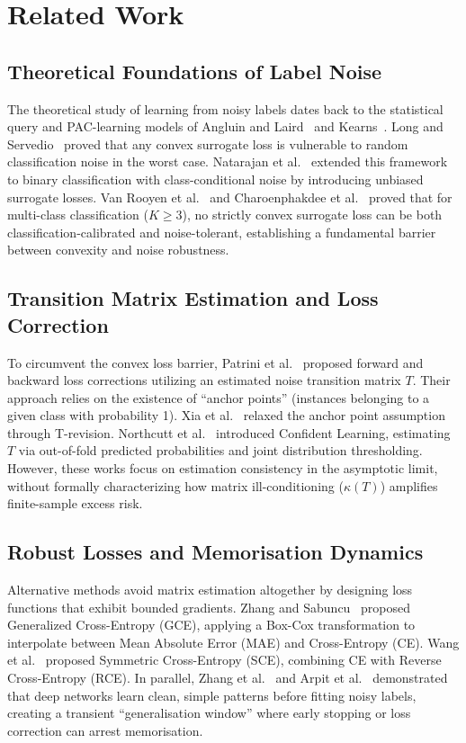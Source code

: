 \documentclass[journal]{IEEEtran}
\theoremstyle{definition}
\begin{document}
\section{Related Work}

\subsection{Theoretical Foundations of Label Noise}
The theoretical study of learning from noisy labels dates back to the statistical query and PAC-learning models of Angluin and Laird~\cite{angluin1988learning} and Kearns~\cite{kearns1998efficient}. Long and Servedio~\cite{long2010random} proved that any convex surrogate loss is vulnerable to random classification noise in the worst case. Natarajan et al.~\cite{natarajan2013learning} extended this framework to binary classification with class-conditional noise by introducing unbiased surrogate losses. Van Rooyen et al.~\cite{van2015learning} and Charoenphakdee et al.~\cite{charoenphakdee2019symmetric} proved that for multi-class classification ($K \ge 3$), no strictly convex surrogate loss can be both classification-calibrated and noise-tolerant, establishing a fundamental barrier between convexity and noise robustness.

\subsection{Transition Matrix Estimation and Loss Correction}
To circumvent the convex loss barrier, Patrini et al.~\cite{patrini2017making} proposed forward and backward loss corrections utilizing an estimated noise transition matrix $T$. Their approach relies on the existence of ``anchor points'' (instances belonging to a given class with probability 1). Xia et al.~\cite{xia2019are} relaxed the anchor point assumption through T-revision. Northcutt et al.~\cite{northcutt2021confident} introduced Confident Learning, estimating $T$ via out-of-fold predicted probabilities and joint distribution thresholding. However, these works focus on estimation consistency in the asymptotic limit, without formally characterizing how matrix ill-conditioning ($\kappa(T)$) amplifies finite-sample excess risk.

\subsection{Robust Losses and Memorisation Dynamics}
Alternative methods avoid matrix estimation altogether by designing loss functions that exhibit bounded gradients. Zhang and Sabuncu~\cite{zhang2018generalized} proposed Generalized Cross-Entropy (GCE), applying a Box-Cox transformation to interpolate between Mean Absolute Error (MAE) and Cross-Entropy (CE). Wang et al.~\cite{wang2019symmetric} proposed Symmetric Cross-Entropy (SCE), combining CE with Reverse Cross-Entropy (RCE). In parallel, Zhang et al.~\cite{zhang2017understanding} and Arpit et al.~\cite{arpit2017closer} demonstrated that deep networks learn clean, simple patterns before fitting noisy labels, creating a transient ``generalisation window'' where early stopping or loss correction can arrest memorisation.
\end{document}
